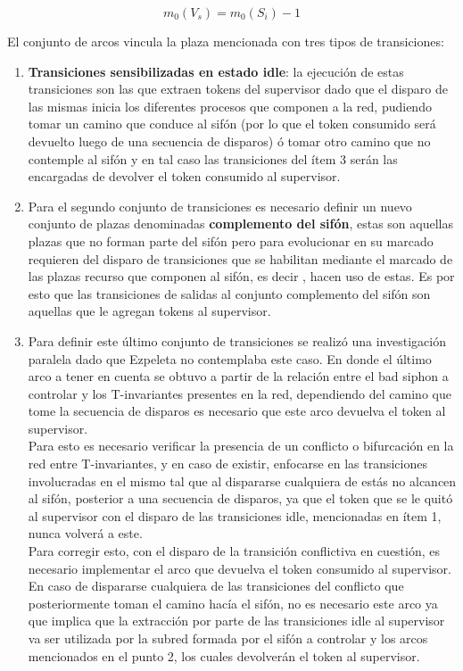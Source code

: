 \begin{equation}
    m_0(V_s) = m_0(S_i)-1 
\end{equation}

\noindent El conjunto de arcos vincula la plaza mencionada con tres tipos de transiciones:
\begin{enumerate}
    \item \textbf{Transiciones sensibilizadas en estado idle}: la ejecución de estas transiciones son las que extraen tokens del supervisor dado que el disparo de las mismas inicia los diferentes procesos que componen a la red, pudiendo tomar un camino que conduce al sifón (por lo que el token consumido será devuelto luego de una secuencia de disparos) ó tomar otro camino que no contemple al sifón y en tal caso las transiciones del ítem 3 serán las encargadas de devolver el token consumido al supervisor. 
    
    \item Para el segundo conjunto de transiciones es necesario definir un nuevo conjunto de plazas denominadas \textbf{complemento del sifón}, estas son aquellas plazas que no forman parte del sifón pero para evolucionar en su marcado requieren del disparo de transiciones que se habilitan mediante el marcado de las plazas recurso que componen al sifón, es decir , hacen uso de estas. Es por esto que las transiciones de salidas al conjunto complemento del sifón son aquellas que le agregan tokens al supervisor.
    
    \item Para definir este último conjunto de transiciones se realizó una investigación paralela dado que Ezpeleta no contemplaba este caso. En donde el último arco a tener en cuenta se obtuvo a partir de la relación entre el bad siphon a controlar y los T-invariantes presentes en la red, dependiendo del camino que tome la secuencia de disparos es necesario que este arco devuelva el token al supervisor. \\
    Para esto es necesario verificar la presencia de un conflicto o bifurcación en la red entre T-invariantes, y en caso de existir, enfocarse en las transiciones involucradas en el mismo tal que al dispararse cualquiera de estás no alcancen al sifón, posterior a una secuencia de disparos, ya que el token que se le quitó al supervisor con el disparo de las transiciones idle, mencionadas en ítem 1, nunca volverá a este. \\
    Para corregir esto, con el disparo de la transición conflictiva en cuestión, es necesario implementar el arco que devuelva el token consumido al supervisor. \\
	En caso de dispararse cualquiera de las transiciones del conflicto que posteriormente toman el camino hacía el sifón, no es necesario este arco ya que implica que la extracción por parte de las transiciones idle al supervisor va ser utilizada por la subred formada por el sifón a controlar y los arcos mencionados en el punto 2, los cuales devolverán el token al supervisor.
\end{enumerate}

